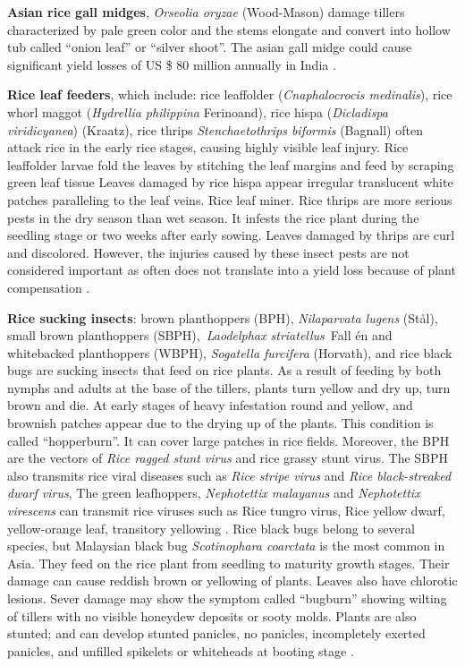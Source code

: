 \documentclass[12pt, oneside]{report}
\begin{document}
\textbf{Asian rice gall midges}, \textit{Orseolia oryzae} (Wood-Mason) damage tillers characterized by pale green color and the stems elongate and convert into hollow tub called ``onion leaf'' or ``silver shoot''\citep{pathak1994insect}. The asian gall midge could cause significant yield losses of US \$ 80 million annually in India \citep{bennett2004new}. 

\textbf{Rice leaf feeders}, which include: rice leaffolder (\textit{Cnaphalocrocis medinalis}), rice whorl maggot (\textit{Hydrellia philippina} Ferinoand), rice hispa (\textit{Dicladispa viridicyanea}) (Kraatz), rice thrips \textit{Stenchaetothrips biformis} (Bagnall) often attack rice in the early rice stages, causing highly visible leaf injury. Rice leaffolder larvae fold the leaves by stitching the leaf margins and feed by scraping green leaf tissue Leaves damaged by rice hispa appear irregular translucent white patches paralleling to the leaf veins. Rice leaf miner. Rice thrips are more serious pests in the dry season than wet season. It infests the rice plant during the seedling stage or two weeks after early sowing. Leaves damaged by thrips are curl and discolored. However, the injuries caused by these insect pests are not considered important as often does not translate into a yield loss because of plant compensation \citep{pathak1994insect, shepard1995rice}.

\textbf{Rice sucking insects}: brown planthoppers (BPH), \textit{Nilaparvata lugens} (St\aa l), small brown planthoppers (SBPH), \textit{Laodelphax striatellus} Fall \'en and whitebacked planthoppers (WBPH), \textit{Sogatella furcifera} (Horvath), and rice black bugs are sucking insects that feed on rice plants. As a result of feeding by both nymphs and adults at the base of the tillers, plants turn yellow and dry up, turn brown and die. At early stages of heavy infestation round and yellow, and brownish patches appear due to the drying up of the plants. This condition is called ``hopperburn''. It can cover large patches in rice fields. Moreover, the BPH are the vectors of \textit{Rice ragged stunt virus} and rice grassy stunt virus. The SBPH also transmits rice viral diseases such as \textit{Rice stripe virus} and \textit{Rice black-streaked dwarf virus}, The green leafhoppers, \textit{Nephotettix malayanus} and \textit{Nephotettix virescens} can transmit rice viruses such as Rice tungro virus, Rice yellow dwarf, yellow-orange leaf, transitory yellowing \citep{ling1972rice}. Rice black bugs belong to several species, but Malaysian black bug \textit{Scotinophara coarctata} is the most common in Asia. They feed on the rice plant from seedling to maturity growth stages. Their damage can cause reddish brown or yellowing of plants. Leaves also have chlorotic lesions. Sever damage may show the symptom called ``bugburn'' showing wilting of tillers with no visible honeydew deposits or sooty molds. Plants are also stunted; and can develop stunted panicles, no panicles, incompletely exerted panicles, and unfilled spikelets or whiteheads at booting stage \citep{shepard1995rice}.
\end{document}
